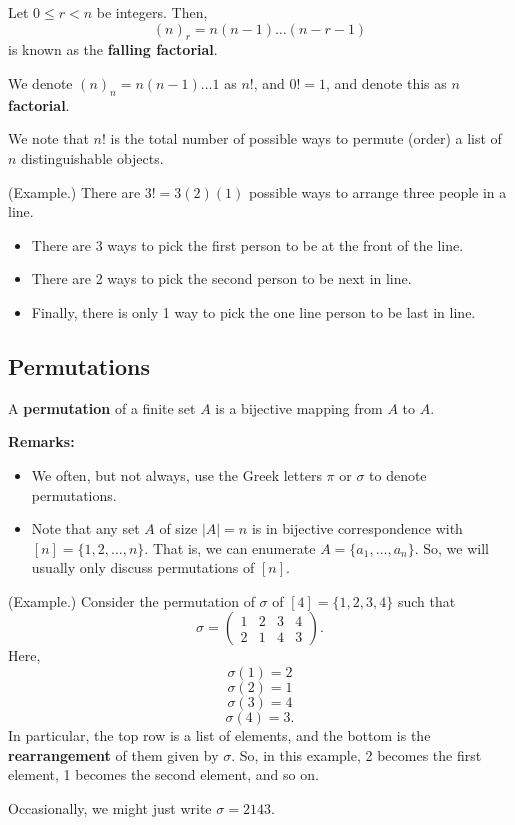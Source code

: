 \begin{definition}{}{}
    Let $0 \leq r < n$ be integers. Then, 
    \[(n)_r = n(n - 1) \dots (n - r - 1)\]
    is known as the \textbf{falling factorial}.
\end{definition}

\begin{definition}{}{}
    We denote $(n)_n = n(n - 1) \dots 1$ as $n!$, and $0! = 1$, and denote this as $n$ \textbf{factorial}.
\end{definition}
We note that $n!$ is the total number of possible ways to permute (order) a list of $n$ distinguishable objects. 

\begin{mdframed}[]
    (Example.) There are $3! = 3(2)(1)$ possible ways to arrange three people in a line.
    \begin{itemize}
        \item There are 3 ways to pick the first person to be at the front of the line. 
        \item There are 2 ways to pick the second person to be next in line. 
        \item Finally, there is only 1 way to pick the one line person to be last in line. 
    \end{itemize}
\end{mdframed}

\subsection{Permutations}

\begin{definition}{}{}
    A \textbf{permutation} of a finite set $A$ is a bijective mapping from $A$ to $A$. 
\end{definition}
\textbf{Remarks:}
\begin{itemize}
    \item We often, but not always, use the Greek letters $\pi$ or $\sigma$ to denote permutations. 
    \item Note that any set $A$ of size $|A| = n$ is in bijective correspondence with $[n] = \{1, 2, \dots, n\}$. That is, we can enumerate $A = \{a_1, \dots, a_n\}$. So, we will usually only discuss permutations of $[n]$. 
\end{itemize}

\begin{mdframed}[]
    (Example.) Consider the permutation of $\sigma$ of $[4] = \{1, 2, 3, 4\}$ such that 
    \[\sigma = \begin{pmatrix}
        1 & 2 & 3 & 4 \\ 
        2 & 1 & 4 & 3
    \end{pmatrix}.\]
    Here, 
    \[\sigma(1) = 2\]
    \[\sigma(2) = 1\]
    \[\sigma(3) = 4\]
    \[\sigma(4) = 3.\]
    In particular, the top row is a list of elements, and the bottom is the \textbf{rearrangement} of them given by $\sigma$. So, in this example, 2 becomes the first element, 1 becomes the second element, and so on.

    \bigskip 

    Occasionally, we might just write $\sigma = 2143$. 
\end{mdframed}

